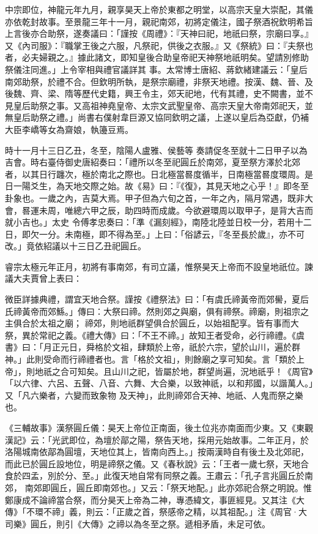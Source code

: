 \begin{pinyinscope}
 中宗即位，神龍元年九月，親享昊天上帝於東都之明堂，以高宗天皇大崇配，其儀亦依乾封故事。至景龍三年十一月，親祀南郊，初將定儀注，國子祭酒祝欽明希旨上言後亦合助祭，遂奏議曰：「謹按《周禮》：『天神曰祀，地祇曰祭，宗廟曰享。』又《內司服》：『職掌王後之六服，凡祭祀，供後之衣服。』又《祭統》曰：『夫祭也者，必夫婦親之。』據此諸文，即知皇後合助皇帝祀天神祭地祇明矣。望請別修助祭儀注同進。」上令宰相與禮官議詳其
 事。太常博士唐紹、蔣欽緒建議云：「皇后南郊助祭，於禮不合。但欽明所執，是祭宗廟禮，非祭天地禮。按漢、魏、晉、及後魏、齊、梁、隋等歷代史籍，興王令主，郊天祀地，代有其禮，史不闕書，並不見皇后助祭之事。又高祖神堯皇帝、太宗文武聖皇帝、高宗天皇大帝南郊祀天，並無皇后助祭之禮。」尚書右僕射韋巨源又協同欽明之議，上遂以皇后為亞獻，仍補大臣李嶠等女為齋娘，執籩豆焉。



 時十一月十三日乙丑，冬至，陰陽人盧雅、侯藝等
 奏請促冬至就十二日甲子以為吉會。時右臺侍御史唐紹奏曰：「禮所以冬至祀圓丘於南郊，夏至祭方澤於北郊者，以其日行躔次，極於南北之際也。日北極當晷度循半，日南極當晷度環周。是日一陽爻生，為天地交際之始。故《易》曰：『《復》，其見天地之心乎！』即冬至卦象也。一歲之內，吉莫大焉。甲子但為六旬之首，一年之內，隔月常遇，既非大會，晷運未周，唯總六甲之辰，助四時而成歲。今欲避環周以取甲子，是背大吉而就小吉也。」太史
 令傅孝忠奏曰：「準《漏刻經》，南陸北陸並日校一分，若用十二日，即欠一分。未南極，即不得為至。」上曰：「俗諺云，『冬至長於歲』，亦不可改。」竟依紹議以十三日乙丑祀圓丘。



 睿宗太極元年正月，初將有事南郊，有司立議，惟祭昊天上帝而不設皇地祇位。諫議大夫賈曾上表曰：



 微臣詳據典禮，謂宜天地合祭。謹按《禮祭法》曰：「有虞氏禘黃帝而郊嚳，夏后氏禘黃帝而郊鯀。」傳曰：大祭曰禘。然則郊之與廟，俱有禘祭。禘廟，則祖宗之主俱合於太祖之廟；
 禘郊，則地祇群望俱合於圓丘，以始祖配享。皆有事而大祭，異於常祀之義。《禮大傳》曰：「不王不禘。」故知王者受命，必行禘禮。《虞書》曰：「月正元日，舜格於文祖，肆類於上帝，祇於六宗，望於山川，遍於群神。」此則受命而行禘禮者也。言「格於文祖」，則餘廟之享可知矣。言「類於上帝」，則地祇之合可知矣。且山川之祀，皆屬於地，群望尚遍，況地祇乎！《周官》「以六律、六呂、五聲、八音、六舞、大合樂，以致神祇，以和邦國，以諧萬人。」又「凡六樂者，六變而致象物
 及天神」，此則禘郊合天神、地祇、人鬼而祭之樂也。



 《三輔故事》漢祭圓丘儀：昊天上帝位正南面，後土位兆亦南面而少東。又《東觀漢記》云：「光武即位，為壇於鄗之陽，祭告天地，採用元始故事。二年正月，於洛陽城南依鄗為圓壇，天地位其上，皆南向西上。」按兩漢時自有後土及北郊祀，而此已於圓丘設地位，明是禘祭之儀。又《春秋說》云：「王者一歲七祭，天地合食於四孟，別於分、至。」此復天地自常有同祭之義。王肅云：「孔子言兆圓丘於南郊，
 南郊即圓丘，圓丘即南郊也。」又云：「祭天地配。」此亦郊祀合祭之明說。惟鄭康成不論禘當合祭，而分昊天上帝為二神，專憑緯文，事匪經見。又其注《大傳》「不環不禘」義，則云：「正歲之首，祭感帝之精，以其祖配。」注《周官·大司樂》圓丘，則引《大傳》之禘以為冬至之祭。遞相矛盾，未足可依。




\end{pinyinscope}
